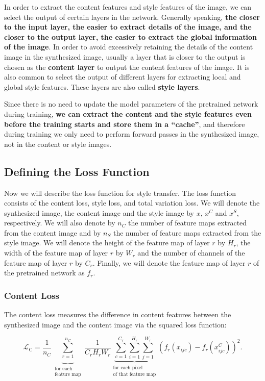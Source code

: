 In order to extract the content features and style features of the image, we can select the output of certain layers in the network. Generally speaking, \textbf{the closer to the input layer, the easier to extract details of the image, and the closer to the output layer, the easier to extract the global information of the image}. In order to avoid excessively retaining the details of the content image in the synthesized image,  usually a layer that is closer to the output is chosen as the \textbf{content layer} to output the content features of the image. It is also common to select the output of different layers for extracting local and global style features. These layers are also called \textbf{style layers}.

Since there is no need to update the model parameters of the pretrained network during training, \textbf{we can extract the content and the style features even before the training starts and store them in a ``cache''}, and therefore during training we only need to perform forward passes in the synthesized image, not in the content or style images.

\subsection{Defining the Loss Function}

Now we will describe the loss function for style transfer. The loss function consists of the content loss, style loss, and total variation loss. We will denote the synthesized image, the content image and the style image by $x$, $x^C$ and $x^S$, respectively. We will also denote by $n_C$ the number of feature maps extracted from the content image and by $n_S$ the number of feature maps extracted from the style image. We will denote the height of the feature map of layer $r$ by $H_r$, the width of the feature map of layer $r$ by $W_r$ and the number of channels of the feature map of layer $r$ by $C_r$. Finally, we will denote the feature map of layer $r$ of the pretrained network as $f_r$.

\subsubsection{Content Loss}

The content loss measures the difference in content features between the synthesized image and the content image via the squared loss function:

$$
\mathcal{L}_\text{C} = \dfrac{1}{n_C}
\underbrace{\sum_{r=1}^{n_C}}_{\substack{\text{for each} \\ \text{feature map}}}\dfrac{1}{C_rH_rW_r}
\underbrace{\sum_{c=1}^{C_r}\sum_{i=1}^{H_r}\sum_{j=1}^{W_r}}_{\substack{\text{for each pixel} \\ \text{of that feature map}}}
\left(f_r\left(x_{ijc}\right)-f_r\left(x^C_{ijc}\right)\right)^2.
$$

